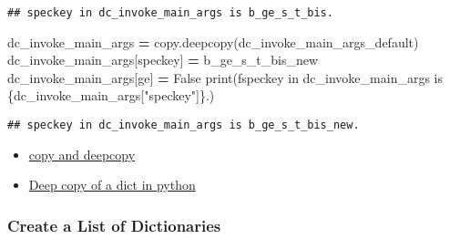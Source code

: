 \documentclass[
]{book}
\newenvironment{Shaded}{\begin{snugshade}}{\end{snugshade}}
\newcommand{\BuiltInTok}[1]{#1}
\newcommand{\NormalTok}[1]{#1}
\newcommand{\OperatorTok}[1]{\textcolor[rgb]{0.81,0.36,0.00}{\textbf{#1}}}
\newcommand{\SpecialCharTok}[1]{\textcolor[rgb]{0.00,0.00,0.00}{#1}}
\newcommand{\SpecialStringTok}[1]{\textcolor[rgb]{0.31,0.60,0.02}{#1}}
\newcommand{\StringTok}[1]{\textcolor[rgb]{0.31,0.60,0.02}{#1}}
\newcommand{\VariableTok}[1]{\textcolor[rgb]{0.00,0.00,0.00}{#1}}
\providecommand{\tightlist}{%
  \setlength{\itemsep}{0pt}\setlength{\parskip}{0pt}}
\begin{document}
\begin{verbatim}
## speckey in dc_invoke_main_args is b_ge_s_t_bis.
\end{verbatim}

\begin{Shaded}
\begin{Highlighting}[]
\NormalTok{dc\_invoke\_main\_args }\OperatorTok{=}\NormalTok{ copy.deepcopy(dc\_invoke\_main\_args\_default)}
\NormalTok{dc\_invoke\_main\_args[}\StringTok{\textquotesingle{}speckey\textquotesingle{}}\NormalTok{] }\OperatorTok{=} \StringTok{\textquotesingle{}b\_ge\_s\_t\_bis\_new\textquotesingle{}}
\NormalTok{dc\_invoke\_main\_args[}\StringTok{\textquotesingle{}ge\textquotesingle{}}\NormalTok{] }\OperatorTok{=} \VariableTok{False}
\BuiltInTok{print}\NormalTok{(}\SpecialStringTok{f\textquotesingle{}speckey in dc\_invoke\_main\_args is }\SpecialCharTok{\{}\NormalTok{dc\_invoke\_main\_args[}\StringTok{"speckey"}\NormalTok{]}\SpecialCharTok{\}}\SpecialStringTok{.\textquotesingle{}}\NormalTok{)}
\end{Highlighting}
\end{Shaded}

\begin{verbatim}
## speckey in dc_invoke_main_args is b_ge_s_t_bis_new.
\end{verbatim}

\begin{itemize}
\tightlist
\item
  \href{https://docs.python.org/2/library/copy.html}{copy and deepcopy}
\item
  \href{https://stackoverflow.com/questions/5105517/deep-copy-of-a-dict-in-python}{Deep copy of a dict in python}
\end{itemize}

\hypertarget{create-a-list-of-dictionaries}{%
\subsubsection{Create a List of Dictionaries}\label{create-a-list-of-dictionaries}}
\end{document}
